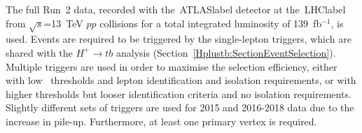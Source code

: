 The full Run~2 data, recorded with the~\acrshort{ATLASlabel} detector at the~\acrshort{LHClabel} from $\sqrt{s}$=13~TeV $pp$ collisions for a total integrated luminosity of 139~fb$^{-1}$, is used. Events are required to be triggered by the single-lepton triggers, which are shared with the $H^+\to tb$ analysis (Section~\ref{Hplustb:SectionEventSelection}). Multiple triggers are used in order to maximise the selection efficiency, either with low \pT\ thresholds and lepton identification and isolation requirements, or with higher thresholds but looser identification criteria and no isolation requirements. Slightly different sets of triggers are used for 2015 and 2016-2018 data due to the increase in pile-up. Furthermore, at least one primary vertex is required.\\ %


